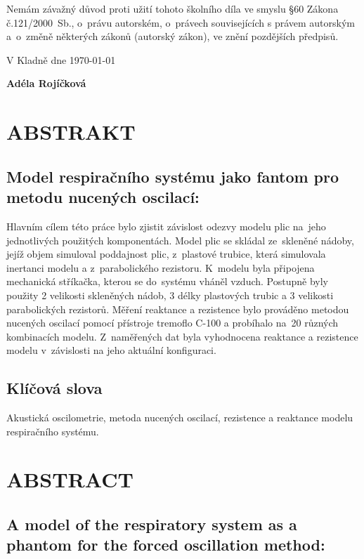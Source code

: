 \documentclass[a4paper,12pt]{article}   %
\numberwithin{equation}{section}        %
\newcommand{\autor}{Adéla Rojíčková}
\newcommand{\nazev}{Model respiračního systému jako fantom pro metodu nucených oscilací}
\newcommand{\nazevENG}{A model of the respiratory system as a phantom for the forced oscillation method}
\begin{document}
    \hspace{-0.75cm}Nemám závažný důvod proti užití tohoto školního díla ve smyslu \S 60 Zákona č.121/2000~Sb., o~právu autorském, o~právech souvisejících s právem autorským a~o~změně některých zákonů (autorský zákon), ve znění pozdějších předpisů. 
    
    \vspace{1em}
    
    \hspace{-0.75cm}V Kladně dne \today \hfill 

    \hspace{10cm} \textbf{\autor}

	\clearpage
	

	
	\null\vfill	
	\section*{ABSTRAKT}
        \subsection*{\nazev:}
	    Hlavním cílem této práce bylo zjistit závislost odezvy modelu plic na~jeho jednotlivých použitých komponentách. Model plic se skládal ze~skleněné nádoby, jejíž objem simuloval poddajnost plic, z~plastové trubice, která simulovala inertanci modelu a z~parabolického rezistoru. K~modelu byla připojena mechanická stříkačka, kterou se do~systému vháněl vzduch. Postupně byly použity 2 velikosti skleněných nádob, 3 délky plastových trubic a 3 velikosti parabolických rezistorů. Měření reaktance a rezistence bylo prováděno metodou nucených oscilací pomocí přístroje tremoflo C-100 a probíhalo na~20 různých kombinacích modelu. Z~naměřených dat byla vyhodnocena reaktance a rezistence modelu v~závislosti na jeho aktuální konfiguraci.
	\subsection*{Klíčová slova}
		Akustická oscilometrie, metoda nucených oscilací, rezistence a reaktance modelu respiračního systému.
	\clearpage
		
		
	\null\vfill	
	\section*{ABSTRACT}
        \subsection*{\nazevENG:}
		 
\end{document}
